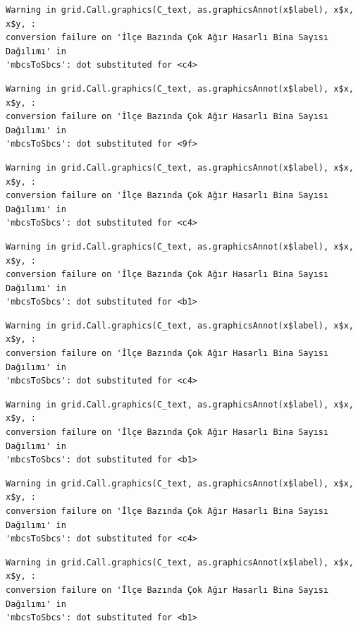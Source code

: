 \documentclass[
  11pt,
  a4paper,
  DIV=11,
  numbers=noendperiod]{scrartcl}
\begin{document}
\begin{verbatim}
Warning in grid.Call.graphics(C_text, as.graphicsAnnot(x$label), x$x, x$y, :
conversion failure on 'İlçe Bazında Çok Ağır Hasarlı Bina Sayısı Dağılımı' in
'mbcsToSbcs': dot substituted for <c4>
\end{verbatim}

\begin{verbatim}
Warning in grid.Call.graphics(C_text, as.graphicsAnnot(x$label), x$x, x$y, :
conversion failure on 'İlçe Bazında Çok Ağır Hasarlı Bina Sayısı Dağılımı' in
'mbcsToSbcs': dot substituted for <9f>
\end{verbatim}

\begin{verbatim}
Warning in grid.Call.graphics(C_text, as.graphicsAnnot(x$label), x$x, x$y, :
conversion failure on 'İlçe Bazında Çok Ağır Hasarlı Bina Sayısı Dağılımı' in
'mbcsToSbcs': dot substituted for <c4>
\end{verbatim}

\begin{verbatim}
Warning in grid.Call.graphics(C_text, as.graphicsAnnot(x$label), x$x, x$y, :
conversion failure on 'İlçe Bazında Çok Ağır Hasarlı Bina Sayısı Dağılımı' in
'mbcsToSbcs': dot substituted for <b1>
\end{verbatim}

\begin{verbatim}
Warning in grid.Call.graphics(C_text, as.graphicsAnnot(x$label), x$x, x$y, :
conversion failure on 'İlçe Bazında Çok Ağır Hasarlı Bina Sayısı Dağılımı' in
'mbcsToSbcs': dot substituted for <c4>
\end{verbatim}

\begin{verbatim}
Warning in grid.Call.graphics(C_text, as.graphicsAnnot(x$label), x$x, x$y, :
conversion failure on 'İlçe Bazında Çok Ağır Hasarlı Bina Sayısı Dağılımı' in
'mbcsToSbcs': dot substituted for <b1>
\end{verbatim}

\begin{verbatim}
Warning in grid.Call.graphics(C_text, as.graphicsAnnot(x$label), x$x, x$y, :
conversion failure on 'İlçe Bazında Çok Ağır Hasarlı Bina Sayısı Dağılımı' in
'mbcsToSbcs': dot substituted for <c4>
\end{verbatim}

\begin{verbatim}
Warning in grid.Call.graphics(C_text, as.graphicsAnnot(x$label), x$x, x$y, :
conversion failure on 'İlçe Bazında Çok Ağır Hasarlı Bina Sayısı Dağılımı' in
'mbcsToSbcs': dot substituted for <b1>
\end{verbatim}
\end{document}
